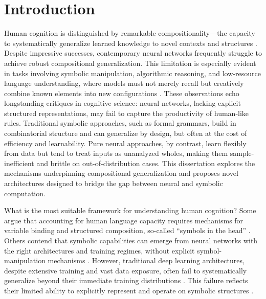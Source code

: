 \chapter{Introduction} \label{chap:chap-0}

Human cognition is distinguished by remarkable compositionality—the capacity to systematically generalize learned knowledge to novel contexts and structures \citep{fodor1988connectionism,Lake_2018_GeneralizationSystematicityCompositional}. Despite impressive successes, contemporary neural networks frequently struggle to achieve robust compositional generalization. This limitation is especially evident in tasks involving symbolic manipulation, algorithmic reasoning, and low-resource language understanding, where models must not merely recall but creatively combine known elements into new configurations \citep{Marcus2001-MARTAM-10, Lake_2018_GeneralizationSystematicityCompositional}. These observations echo longstanding critiques in cognitive science: neural networks, lacking explicit structured representations, may fail to capture the productivity of human-like rules. Traditional symbolic approaches, such as formal grammars, build in combinatorial structure and can generalize by design, but often at the cost of efficiency and learnability. Pure neural approaches, by contrast, learn flexibly from data but tend to treat inputs as unanalyzed wholes, making them sample-inefficient and brittle on out-of-distribution cases. This dissertation explores the mechanisms underpinning compositional generalization and proposes novel architectures designed to bridge the gap between neural and symbolic computation.

What is the most suitable framework for understanding human cognition? Some argue that accounting for human language capacity requires mechanisms for variable binding and structured composition, so-called “symbols in the head” \citep{Marcus2001-MARTAM-10, tenenbaum2011grow}. Others contend that symbolic capabilities can emerge from neural networks with the right architectures and training regimes, without explicit symbol-manipulation mechanisms \citep{elman_finding_1990, rumelhart1986c}. However, traditional deep learning architectures, despite extensive training and vast data exposure, often fail to systematically generalize beyond their immediate training distributions \citep{kim_cogs_2020, hupkes2020compositionality, najoung}. This failure reflects their limited ability to explicitly represent and operate on symbolic structures \citep{smolensky_tensor_1990}.

